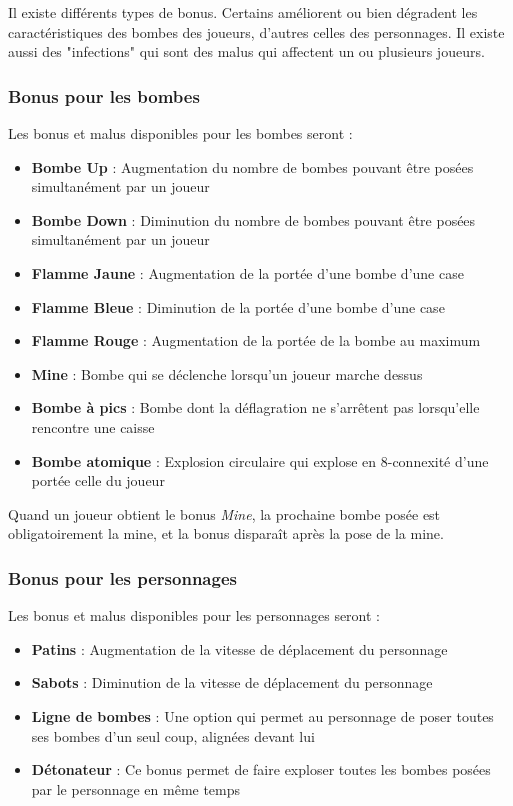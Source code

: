 Il existe différents types de bonus. Certains améliorent ou bien dégradent les caractéristiques des bombes des joueurs, d'autres celles des personnages. Il existe aussi des "infections" qui sont des malus qui affectent un ou plusieurs joueurs.

\subsubsection{Bonus pour les bombes}

Les bonus et malus disponibles pour les bombes seront :
\begin{itemize}
\item \textbf{Bombe Up} : Augmentation du nombre de bombes pouvant être posées simultanément par un joueur
\item \textbf{Bombe Down} : Diminution du nombre de bombes pouvant être posées simultanément par un joueur
\item \textbf{Flamme Jaune} : Augmentation de la portée d'une bombe d'une case
\item \textbf{Flamme Bleue} : Diminution de la portée d'une bombe d'une case
\item \textbf{Flamme Rouge} : Augmentation de la portée de la bombe au maximum
\item \textbf{Mine} : Bombe qui se déclenche lorsqu'un joueur marche dessus
\item \textbf{Bombe à pics} : Bombe dont la déflagration ne s'arrêtent pas lorsqu'elle rencontre une caisse
\item \textbf{Bombe atomique} : Explosion circulaire qui explose en 8-connexité d'une portée celle du joueur
\end{itemize}

Quand un joueur obtient le bonus \emph{Mine}, la prochaine bombe posée est obligatoirement la mine, et la bonus disparaît après la pose de la mine.

\subsubsection{Bonus pour les personnages}

Les bonus et malus disponibles pour les personnages seront :
\begin{itemize}
\item \textbf{Patins} : Augmentation de la vitesse de déplacement du personnage
\item \textbf{Sabots} : Diminution de la vitesse de déplacement du personnage
\item \textbf{Ligne de bombes} : Une option qui permet au personnage de poser toutes ses bombes d'un seul coup, alignées devant lui
\item \textbf{Détonateur} : Ce bonus permet de faire exploser toutes les bombes posées par le personnage en même temps
\end{itemize}

